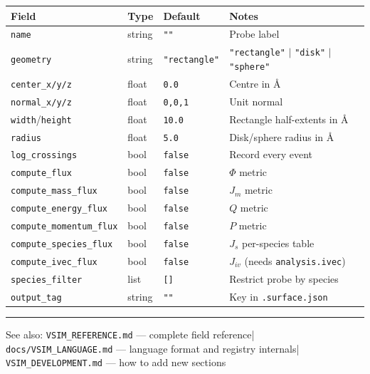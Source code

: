 \documentclass[11pt,a4paper]{article}
\begin{document}
\begin{center}\footnotesize
\begin{tabular}{@{}llll@{}}
\toprule
Field & Type & Default & Notes \\
\midrule
\texttt{name}          & string & \texttt{""} & Probe label \\
\texttt{geometry}      & string & \texttt{"rectangle"} & \texttt{"rectangle"} $|$ \texttt{"disk"} $|$ \texttt{"sphere"} \\
\texttt{center\_x/y/z} & float  & \texttt{0.0} & Centre in \AA \\
\texttt{normal\_x/y/z} & float  & \texttt{0,0,1} & Unit normal \\
\texttt{width}/\texttt{height} & float & \texttt{10.0} & Rectangle half-extents in \AA \\
\texttt{radius}        & float  & \texttt{5.0} & Disk/sphere radius in \AA \\
\texttt{log\_crossings}       & bool & \texttt{false} & Record every event \\
\texttt{compute\_flux}        & bool & \texttt{false} & $\Phi$ metric \\
\texttt{compute\_mass\_flux}  & bool & \texttt{false} & $J_m$ metric \\
\texttt{compute\_energy\_flux} & bool & \texttt{false} & $Q$ metric \\
\texttt{compute\_momentum\_flux} & bool & \texttt{false} & $P$ metric \\
\texttt{compute\_species\_flux} & bool & \texttt{false} & $J_s$ per-species table \\
\texttt{compute\_ivec\_flux}  & bool & \texttt{false} & $J_{iv}$ (needs \texttt{analysis.ivec}) \\
\texttt{species\_filter}      & list & \texttt{[]} & Restrict probe by species \\
\texttt{output\_tag}          & string & \texttt{""} & Key in \texttt{.surface.json} \\
\bottomrule
\end{tabular}
\end{center}

\vfill
\hrule
\smallskip
{\footnotesize\color{vsimgrey}
See also: \texttt{VSIM\_REFERENCE.md} --- complete field reference\quad|\quad
\texttt{docs/VSIM\_LANGUAGE.md} --- language format and registry internals\quad|\quad
\texttt{VSIM\_DEVELOPMENT.md} --- how to add new sections}
\end{document}
